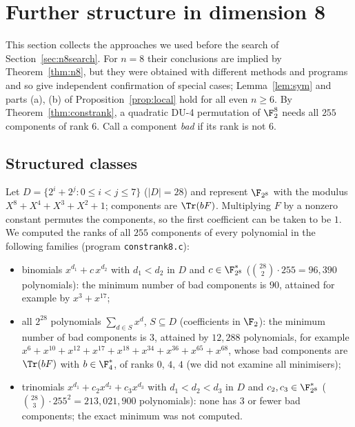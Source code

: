 
\section{Further structure in dimension 8}\label{sec:n8}
This section collects the approaches we used before the search of Section~\ref{sec:n8search}.
For $n=8$ their conclusions are implied by Theorem~\ref{thm:n8}, but they were obtained with
different methods and programs and so give independent confirmation of special cases; Lemma~\ref{lem:sym}
and parts (a), (b) of Proposition~\ref{prop:local} hold for all even $n\ge6$.
By Theorem~\ref{thm:constrank}, a quadratic DU-4 permutation of $\F_2^8$ needs all $255$
components of rank $6$. Call a component \emph{bad} if its rank is not $6$.

\subsection{Structured classes}
Let $D=\{2^i+2^j:0\le i<j\le 7\}$ ($|D|=28$) and represent $\F_{2^8}$ with the modulus
$X^8+X^4+X^3+X^2+1$; components are $\Tr(bF)$. Multiplying $F$ by a nonzero constant permutes
the components, so the first coefficient can be taken to be $1$. We computed the ranks of all
$255$ components of every polynomial in the following families (program \texttt{constrank8.c}):
\begin{itemize}
\item binomials $x^{d_1}+c\,x^{d_2}$ with $d_1<d_2$ in $D$ and $c\in\F_{2^8}^*$
($\binom{28}{2}\cdot 255=96{,}390$ polynomials): the minimum number of bad components is $90$,
attained for example by $x^3+x^{17}$;
\item all $2^{28}$ polynomials $\sum_{d\in S}x^{d}$, $S\subseteq D$ (coefficients in $\F_2$): the
minimum number of bad components is $3$, attained by $12{,}288$ polynomials, for example
$x^{6}+x^{10}+x^{12}+x^{17}+x^{18}+x^{34}+x^{36}+x^{65}+x^{68}$, whose bad components are
$\Tr(bF)$ with $b\in\F_4^*$, of ranks $0$, $4$, $4$ (we did not examine all minimisers);
\item trinomials $x^{d_1}+c_2x^{d_2}+c_3x^{d_3}$ with $d_1<d_2<d_3$ in $D$ and
$c_2,c_3\in\F_{2^8}^*$ ($\binom{28}{3}\cdot 255^2=213{,}021{,}900$ polynomials): none has $3$ or
fewer bad components; the exact minimum was not computed.
\end{itemize}

